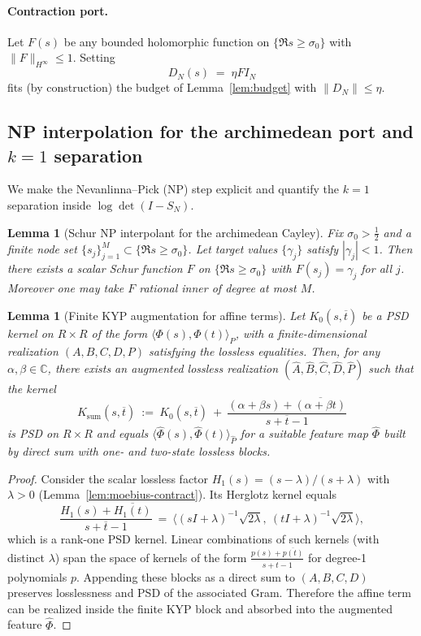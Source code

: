 \documentclass[11pt]{article}
\newtheorem{lemma}[theorem]{Lemma}
\theoremstyle{definition}
\theoremstyle{remark}
\newcommand{\C}{\mathbb{C}}
\begin{document}
\paragraph{Contraction port.}
Let $F(s)$ be any bounded holomorphic function on $\{\Re s\ge \sigma_0\}$ with $\|F\|_{H^\infty}\le 1$. Setting
\[
 D_N(s)\;=\;\eta F I_N
\]
fits (by construction) the budget of Lemma~\ref{lem:budget} with $\|D_N\|\le \eta$.
\subsection{NP interpolation for the archimedean port and $k=1$ separation}\label{subsec:NP-arch}
We make the Nevanlinna--Pick (NP) step explicit and quantify the $k=1$ separation inside $\log\det(I-S_N)$.

\begin{lemma}[Schur NP interpolant for the archimedean Cayley]
Fix $\sigma_0>\tfrac12$ and a finite node set $\{s_j\}_{j=1}^{M}\subset\{\Re s\ge \sigma_0\}$. Let target values $\{\gamma_j\}$ satisfy $|\gamma_j|<1$. Then there exists a scalar Schur function $F$ on $\{\Re s\ge \sigma_0\}$ with $F(s_j)=\gamma_j$ for all $j$. Moreover one may take $F$ rational inner of degree at most $M$.
\end{lemma}

\begin{lemma}[Finite KYP augmentation for affine terms]\label{lem:affine-gram}
Let \(K_0(s,\overline t)\) be a PSD kernel on \(R\times R\) of the form \(\langle \Phi(s),\Phi(t)\rangle_{P}\), with a finite-dimensional realization \((A,B,C,D,P)\) satisfying the lossless equalities. Then, for any \(\alpha,\beta\in\C\), there exists an augmented lossless realization \((\widehat A,\widehat B,\widehat C,\widehat D,\widehat P)\) such that the kernel
\[
 K_\mathrm{sum}(s,\overline t)\ :=\ K_0(s,\overline t)\ +\ \frac{(\alpha+\beta s)+\overline{(\alpha+\beta t)}}{s+\overline t -1}
\]
is PSD on \(R\times R\) and equals \(\langle \widehat\Phi(s),\widehat\Phi(t)\rangle_{\widehat P}\) for a suitable feature map \(\widehat\Phi\) built by direct sum with one- and two-state lossless blocks.
\end{lemma}
\begin{proof}
Consider the scalar lossless factor \(H_1(s)=(s-\lambda)/(s+\lambda)\) with \(\lambda>0\) (Lemma~\ref{lem:moebius-contract}). Its Herglotz kernel equals
\[\frac{H_1(s)+\overline{H_1(t)}}{s+\overline t -1}\ =\ \Big\langle (sI+\lambda)^{-1}\sqrt{2\lambda},\ (tI+\lambda)^{-1}\sqrt{2\lambda}\Big\rangle,\]
which is a rank-one PSD kernel. Linear combinations of such kernels (with distinct \(\lambda\)) span the space of kernels of the form \(\frac{p(s)+\overline{p(t)}}{s+\overline t-1}\) for degree-1 polynomials \(p\). Appending these blocks as a direct sum to \((A,B,C,D)\) preserves losslessness and PSD of the associated Gram. Therefore the affine term can be realized inside the finite KYP block and absorbed into the augmented feature \(\widehat\Phi\).
\end{proof}
\end{document}
